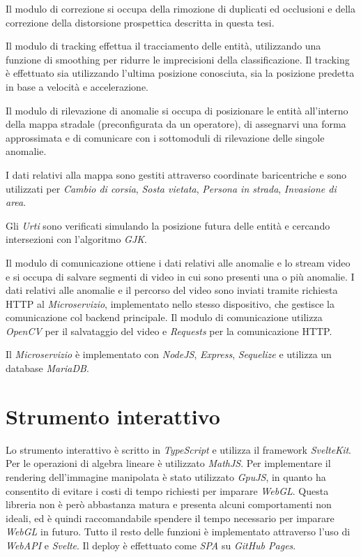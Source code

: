 Il modulo di correzione si occupa della rimozione di duplicati ed occlusioni e della correzione della distorsione prospettica descritta in questa tesi.

Il modulo di tracking effettua il tracciamento delle entità, utilizzando una funzione di smoothing per ridurre le imprecisioni della classificazione.
Il tracking è effettuato sia utilizzando l'ultima posizione conosciuta, sia la posizione predetta in base a velocità e accelerazione.

Il modulo di rilevazione di anomalie si occupa di posizionare le entità all'interno della mappa stradale (preconfigurata da un operatore), di assegnarvi una forma approssimata e di comunicare con i sottomoduli di rilevazione delle singole anomalie.

I dati relativi alla mappa sono gestiti attraverso coordinate baricentriche e sono utilizzati per \emph{Cambio di corsia}, \emph{Sosta vietata}, \emph{Persona in strada}, \emph{Invasione di area}.

Gli \emph{Urti} sono verificati simulando la posizione futura delle entità e cercando intersezioni con l'algoritmo \emph{GJK}.

Il modulo di comunicazione ottiene i dati relativi alle anomalie e lo stream video e si occupa di salvare segmenti di video in cui sono presenti una o più anomalie.
I dati relativi alle anomalie e il percorso del video sono inviati tramite richiesta HTTP al \emph{Microservizio}, implementato nello stesso dispositivo, che gestisce la comunicazione col backend principale.
Il modulo di comunicazione utilizza \emph{OpenCV} per il salvataggio del video e \emph{Requests} per la comunicazione HTTP.

Il \emph{Microservizio} è implementato con \emph{NodeJS}, \emph{Express}, \emph{Sequelize} e utilizza un database \emph{MariaDB}.

\section{Strumento interattivo}
Lo strumento interattivo è scritto in \emph{TypeScript} e utilizza il framework \emph{SvelteKit}.
Per le operazioni di algebra lineare è utilizzato \emph{MathJS}.
Per implementare il rendering dell'immagine manipolata è stato utilizzato \emph{GpuJS}, in quanto ha consentito di evitare i costi di tempo richiesti per imparare \emph{WebGL}.
Questa libreria non è però abbastanza matura e presenta alcuni comportamenti non ideali, ed è quindi raccomandabile spendere il tempo necessario per imparare \emph{WebGL} in futuro.
Tutto il resto delle funzioni è implementato attraverso l'uso di \emph{WebAPI} e \emph{Svelte}.
Il deploy è effettuato come \emph{SPA} su \emph{GitHub Pages}.
